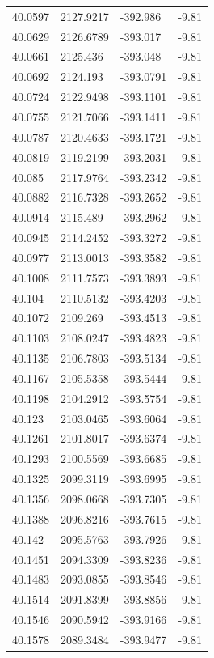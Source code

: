\begin{table}[H]
\begin{tabular}{llll}
40.0597 & 2127.9217 & -392.986 & -9.81 \\
40.0629 & 2126.6789 & -393.017 & -9.81 \\
40.0661 & 2125.436 & -393.048 & -9.81 \\
40.0692 & 2124.193 & -393.0791 & -9.81 \\
40.0724 & 2122.9498 & -393.1101 & -9.81 \\
40.0755 & 2121.7066 & -393.1411 & -9.81 \\
40.0787 & 2120.4633 & -393.1721 & -9.81 \\
40.0819 & 2119.2199 & -393.2031 & -9.81 \\
40.085 & 2117.9764 & -393.2342 & -9.81 \\
40.0882 & 2116.7328 & -393.2652 & -9.81 \\
40.0914 & 2115.489 & -393.2962 & -9.81 \\
40.0945 & 2114.2452 & -393.3272 & -9.81 \\
40.0977 & 2113.0013 & -393.3582 & -9.81 \\
40.1008 & 2111.7573 & -393.3893 & -9.81 \\
40.104 & 2110.5132 & -393.4203 & -9.81 \\
40.1072 & 2109.269 & -393.4513 & -9.81 \\
40.1103 & 2108.0247 & -393.4823 & -9.81 \\
40.1135 & 2106.7803 & -393.5134 & -9.81 \\
40.1167 & 2105.5358 & -393.5444 & -9.81 \\
40.1198 & 2104.2912 & -393.5754 & -9.81 \\
40.123 & 2103.0465 & -393.6064 & -9.81 \\
40.1261 & 2101.8017 & -393.6374 & -9.81 \\
40.1293 & 2100.5569 & -393.6685 & -9.81 \\
40.1325 & 2099.3119 & -393.6995 & -9.81 \\
40.1356 & 2098.0668 & -393.7305 & -9.81 \\
40.1388 & 2096.8216 & -393.7615 & -9.81 \\
40.142 & 2095.5763 & -393.7926 & -9.81 \\
40.1451 & 2094.3309 & -393.8236 & -9.81 \\
40.1483 & 2093.0855 & -393.8546 & -9.81 \\
40.1514 & 2091.8399 & -393.8856 & -9.81 \\
40.1546 & 2090.5942 & -393.9166 & -9.81 \\
40.1578 & 2089.3484 & -393.9477 & -9.81 \\

\end{tabular}
\end{table}
